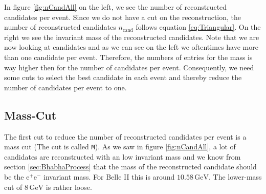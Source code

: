 \documentclass[a4paper,11pt,twosided,final,german,openbib,pdftex,listof=totoc,bibliography=totoc]{scrbook}
\begin{document}
In figure \ref{fig:nCandAll} on the left, we see the number of reconstructed candidates per event. Since we do not have a cut on the reconstruction, the number of reconstructed candidates $n_{\textrm{cand}}$ follows equation \ref{eq:Triangular}. On the right we see the invariant mass of the reconstructed candidates. Note that we are now looking at candidates and as we can see on the left we oftentimes have more than one candidate per event. Therefore, the numbers of entries for the mass is way higher then for the number of candidates per event.
Consequently, we need some cuts to select the best candidate in each event and thereby reduce the number of candidates per event to one.


\subsection{Mass-Cut}

The first cut to reduce the number of reconstructed candidates per event is a mass cut (The cut is called \texttt{M}). As we saw in figure \ref{fig:nCandAll}, a lot of candidates are reconstructed with an low invariant mass and we know from section \ref{sec:BhabhaProcess} that the mass of the reconstructed candidate should be the $\textrm{e}^+\textrm{e}^-$ invariant mass. For Belle II this is around $10.58\,\textrm{GeV}$. The lower-mass cut of $8\,\textrm{GeV}$ is rather loose. 
\end{document}
